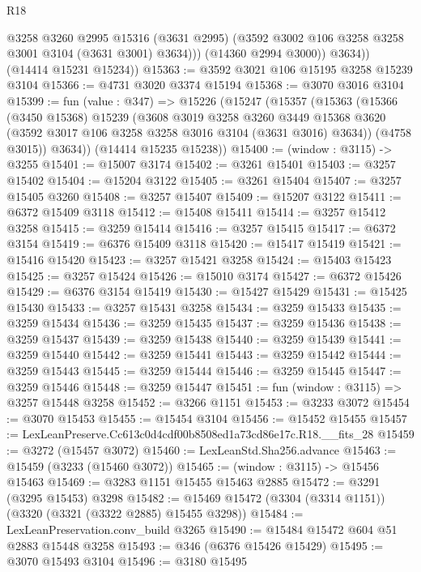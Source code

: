 \begin{lexlean}{R18}
\begin{coremodule}
                @3258
                @3260
                @2995
                @15316
                (@3631 @2995)
                (@3592 @3002 @106 @3258 @3258 @3001 @3104 (@3631 @3001) @3634)))
            (@14360 @2994 @3000))
          @3634))
      (@14414 @15231 @15234))
@15363 := @3592 @3021 @106 @15195 @3258 @15239 @3104
@15366 := @4731 @3020 @3374 @15194
@15368 := @3070 @3016 @3104
@15399 := fun (value : @347) =>
  @15226
    (@15247
      (@15357
        (@15363
          (@15366
            (@3450 @15368)
            @15239
            (@3608
              @3019
              @3258
              @3260
              @3449
              @15368
              @3620
              (@3592 @3017 @106 @3258 @3258 @3016 @3104 (@3631 @3016) @3634))
            (@4758 @3015))
          @3634))
      (@14414 @15235 @15238))
@15400 := (window : @3115) -> @3255
@15401 := @15007 @3174
@15402 := @3261 @15401
@15403 := @3257 @15402
@15404 := @15204 @3122
@15405 := @3261 @15404
@15407 := @3257 @15405 @3260
@15408 := @3257 @15407
@15409 := @15207 @3122
@15411 := @6372 @15409 @3118
@15412 := @15408 @15411
@15414 := @3257 @15412 @3258
@15415 := @3259 @15414
@15416 := @3257 @15415
@15417 := @6372 @3154
@15419 := @6376 @15409 @3118
@15420 := @15417 @15419
@15421 := @15416 @15420
@15423 := @3257 @15421 @3258
@15424 := @15403 @15423
@15425 := @3257 @15424
@15426 := @15010 @3174
@15427 := @6372 @15426
@15429 := @6376 @3154 @15419
@15430 := @15427 @15429
@15431 := @15425 @15430
@15433 := @3257 @15431 @3258
@15434 := @3259 @15433
@15435 := @3259 @15434
@15436 := @3259 @15435
@15437 := @3259 @15436
@15438 := @3259 @15437
@15439 := @3259 @15438
@15440 := @3259 @15439
@15441 := @3259 @15440
@15442 := @3259 @15441
@15443 := @3259 @15442
@15444 := @3259 @15443
@15445 := @3259 @15444
@15446 := @3259 @15445
@15447 := @3259 @15446
@15448 := @3259 @15447
@15451 := fun (window : @3115) => @3257 @15448 @3258
@15452 := @3266 @1151
@15453 := @3233 @3072
@15454 := @3070 @15453
@15455 := @15454 @3104
@15456 := @15452 @15455
@15457 := LexLeanPreserve.Cc613c0d4cdf00b8508ed1a73cd86e17c.R18.__fits_28
@15459 := @3272 (@15457 @3072)
@15460 := LexLeanStd.Sha256.advance
@15463 := @15459 (@3233 (@15460 @3072))
@15465 := (window : @3115) -> @15456 @15463
@15469 := @3283 @1151 @15455 @15463 @2885
@15472 := @3291 (@3295 @15453) @3298
@15482 := @15469 @15472 (@3304 (@3314 @1151)) (@3320 (@3321 (@3322 @2885) @15455 @3298))
@15484 := LexLeanPreservation.conv_build @3265
@15490 := @15484 @15472 @604 @51 @2883 @15448 @3258
@15493 := @346 (@6376 @15426 @15429)
@15495 := @3070 @15493 @3104
@15496 := @3180 @15495

\end{coremodule}
\end{lexlean}
